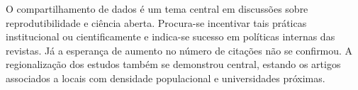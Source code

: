 \documentclass[twocolumn, A4]{article}
\begin{document}
O compartilhamento de dados é um tema central em discussões sobre reprodutibilidade e ciência aberta. Procura-se incentivar tais práticas institucional ou cientificamente e indica-se sucesso em políticas internas das revistas. Já a esperança de aumento no número de citações não se confirmou. 
A regionalização dos estudos também se demonstrou central, estando os artigos associados a locais com densidade populacional e universidades próximas.

\nocite{*}

\end{document}
